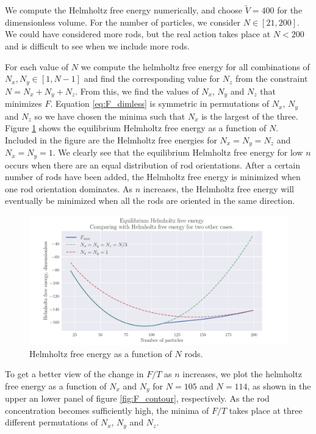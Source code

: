 \documentclass[reprint,english,notitlepage,aps,nobalancelastpage,nofootinbib]{revtex4-1}
\newcommand{\nx}{N_x}
\newcommand{\ny}{N_y}
\newcommand{\nz}{N_z}
\newcommand{\V}{\tilde{V}}
\begin{document}
We compute the Helmholtz free energy numerically, and choose $\V=400$ for the dimensionless volume. For the number of particles, we consider $N\in[21,200]$. We could have considered more rods, but the real action takes place at $N<200$ and is difficult to see when we include more rods. 

For each value of $N$ we compute the helmholtz free energy for all combinations of $\nx,\ny\in[1,N-1]$ and find the corresponding value for $\nz$ from the constraint $N=\nx+\ny+\nz$. From this, we find the values of $\nx,\,\ny$ and $\nz$ that minimizes $F$. Equation \eqref{eq:F_dimless} is symmetric in permutations of $\nx,\,\ny$ and $\nz$ so we have chosen the minima such that $\nx$ is the largest of the three. Figure \ref{fig:F} shows the equilibrium Helmholtz free energy as a function of $N$. Included in the figure are the Helmholtz free energies for $\nx=\ny=\nz$ and $\nx=\ny=1$. We clearly see that the equilibrium Helmholtz free energy for low $n$ occurs when there are an equal distribution of rod orientations. After a certain number of rods have been added, the Helmholtz free energy is minimized when one rod orientation dominates. As $n$ increases, the Helmholtz free energy will eventually be minimized when all the rods are oriented in the same direction. 

\begin{figure}[h!]
	\centering
	\includegraphics[width=0.8\linewidth]{helmholtz_free_energy.pdf}
	\caption{Helmholtz free energy as a function of $N$ rods.}
	\label{fig:F}
\end{figure}

To get a better view of the change in $F/T$ as $n$ increases, we plot the helmholtz free energy as a function of $\nx$ and $\ny$ for $N=105$ and $N=114$, as shown in the upper an lower panel of figure \ref{fig:F_contour}, respectively. As the rod concentration becomes sufficiently high, the minima of $F/T$ takes place at three different permutations of $\nx,\,\ny$ and $\nz$. 
\end{document}

